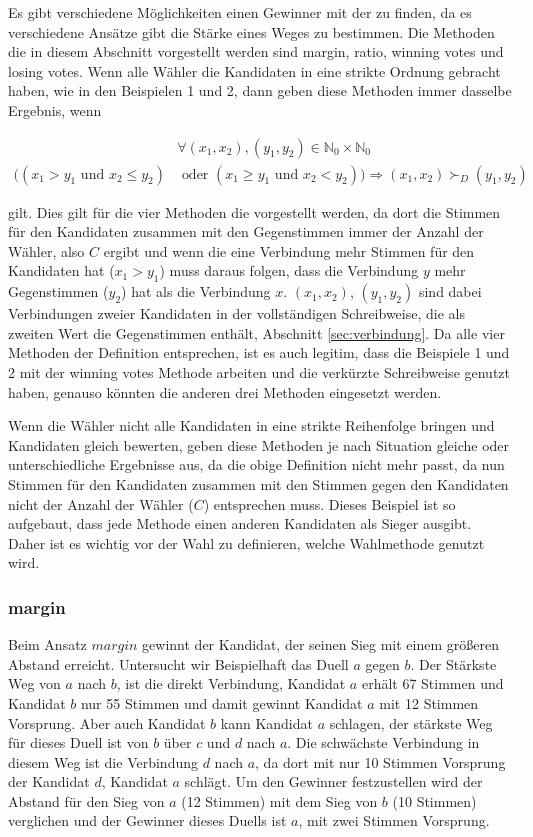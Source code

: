 Es gibt verschiedene Möglichkeiten einen Gewinner mit der \schulze zu finden, da es verschiedene  Ansätze gibt die Stärke eines Weges zu bestimmen. Die Methoden die in diesem Abschnitt vorgestellt werden sind margin, ratio, winning votes und losing votes.  Wenn alle Wähler die Kandidaten in eine strikte Ordnung gebracht haben, wie in den Beispielen 1 und 2, dann geben diese Methoden immer dasselbe Ergebnis, wenn

\begin{align*}
& \forall (x_{1},x_{2}),(y_{1},y_{2}) \in \mathbb{N}_0 	\times \mathbb{N}_0 \\
((x_{1} > y_{1} \textrm{ und }  x_{2}\leq y_{2}) & \textrm{ oder } (x_{1} \geq y_{1} \textrm{ und } x_{2} < y_{2}))\Rightarrow (x_{1},x_{2}) \succ_{D} (y_{1},y_{2})
\end{align*}

gilt. Dies gilt für die vier Methoden die vorgestellt werden, da dort die Stimmen für den Kandidaten zusammen mit den Gegenstimmen immer der Anzahl der Wähler, also $C$ ergibt und wenn die eine Verbindung mehr Stimmen für den Kandidaten hat ($x_{1} > y_{1}$) muss daraus folgen, dass die Verbindung $y$ mehr Gegenstimmen ($y_{2}$) hat als die Verbindung $x$. $(x_{1},x_{2})$, $(y_{1},y_{2})$ sind dabei Verbindungen zweier Kandidaten in der vollständigen Schreibweise, die als zweiten Wert die Gegenstimmen enthält, Abschnitt \ref{sec:verbindung}. Da alle vier Methoden der Definition entsprechen, ist es auch legitim, dass die Beispiele 1 und 2 mit der winning votes Methode arbeiten und die verkürzte Schreibweise genutzt haben, genauso könnten die anderen drei Methoden eingesetzt werden.

Wenn die Wähler nicht alle Kandidaten in eine strikte Reihenfolge bringen und Kandidaten gleich bewerten, geben diese Methoden je nach Situation gleiche oder unterschiedliche Ergebnisse aus, da die obige Definition nicht mehr passt, da nun Stimmen für den Kandidaten zusammen mit den Stimmen gegen den Kandidaten nicht der Anzahl der Wähler ($C$) entsprechen muss.
Dieses Beispiel ist so aufgebaut, dass jede Methode einen anderen Kandidaten als Sieger ausgibt. Daher ist es wichtig vor der Wahl zu definieren, welche Wahlmethode genutzt wird.

\subsubsection{margin}
\label{sec:margin}
Beim Ansatz $margin$ gewinnt der Kandidat, der seinen Sieg mit einem größeren Abstand erreicht. 
Untersucht wir Beispielhaft das Duell $a$ gegen $b$. Der Stärkste Weg von $a$ nach $b$, ist die direkt Verbindung, Kandidat $a$ erhält 67 Stimmen und Kandidat $b$ nur 55 Stimmen und damit gewinnt Kandidat $a$ mit 12 Stimmen Vorsprung. 
Aber auch Kandidat $b$ kann Kandidat $a$ schlagen, der stärkste Weg für dieses Duell ist von $b$ über $c$ und $d$ nach $a$. Die schwächste Verbindung in diesem Weg ist die Verbindung $d$ nach $a$, da dort mit nur 10 Stimmen Vorsprung der Kandidat $d$, Kandidat $a$ schlägt.
Um den Gewinner festzustellen wird der Abstand für den Sieg von $a$ (12 Stimmen) mit dem Sieg von $b$ (10 Stimmen) verglichen und der Gewinner dieses Duells ist $a$, mit zwei Stimmen Vorsprung.

